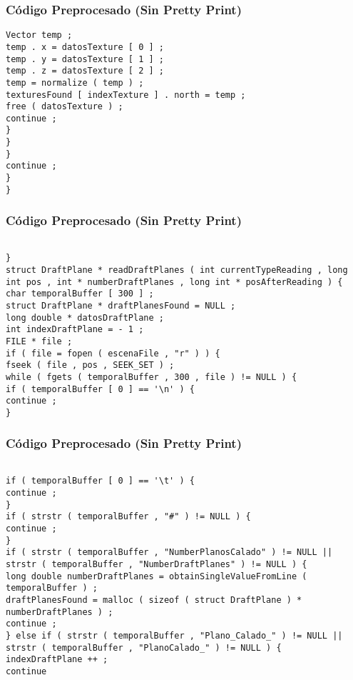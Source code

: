 \documentclass{beamer}
\begin{document}
\begin{frame}[fragile]
\frametitle{C\'odigo Preprocesado (Sin Pretty Print)}
\begin{lstlisting}[style=CStyle]
Vector temp ; 
temp . x = datosTexture [ 0 ] ; 
temp . y = datosTexture [ 1 ] ; 
temp . z = datosTexture [ 2 ] ; 
temp = normalize ( temp ) ; 
texturesFound [ indexTexture ] . north = temp ; 
free ( datosTexture ) ; 
continue ; 
} 
} 
} 
continue ; 
} 
} \end{lstlisting}
\end{frame}
\begin{frame}[fragile]
\frametitle{C\'odigo Preprocesado (Sin Pretty Print)}
\begin{lstlisting}[style=CStyle]

} 
struct DraftPlane * readDraftPlanes ( int currentTypeReading , long int pos , int * numberDraftPlanes , long int * posAfterReading ) { 
char temporalBuffer [ 300 ] ; 
struct DraftPlane * draftPlanesFound = NULL ; 
long double * datosDraftPlane ; 
int indexDraftPlane = - 1 ; 
FILE * file ; 
if ( file = fopen ( escenaFile , "r" ) ) { 
fseek ( file , pos , SEEK_SET ) ; 
while ( fgets ( temporalBuffer , 300 , file ) != NULL ) { 
if ( temporalBuffer [ 0 ] == '\n' ) { 
continue ; 
} \end{lstlisting}
\end{frame}
\begin{frame}[fragile]
\frametitle{C\'odigo Preprocesado (Sin Pretty Print)}
\begin{lstlisting}[style=CStyle]

if ( temporalBuffer [ 0 ] == '\t' ) { 
continue ; 
} 
if ( strstr ( temporalBuffer , "#" ) != NULL ) { 
continue ; 
} 
if ( strstr ( temporalBuffer , "NumberPlanosCalado" ) != NULL || strstr ( temporalBuffer , "NumberDraftPlanes" ) != NULL ) { 
long double numberDraftPlanes = obtainSingleValueFromLine ( temporalBuffer ) ; 
draftPlanesFound = malloc ( sizeof ( struct DraftPlane ) * numberDraftPlanes ) ; 
continue ; 
} else if ( strstr ( temporalBuffer , "Plano_Calado_" ) != NULL || strstr ( temporalBuffer , "PlanoCalado_" ) != NULL ) { 
indexDraftPlane ++ ; 
continue \end{lstlisting}
\end{frame}
\end{document}
